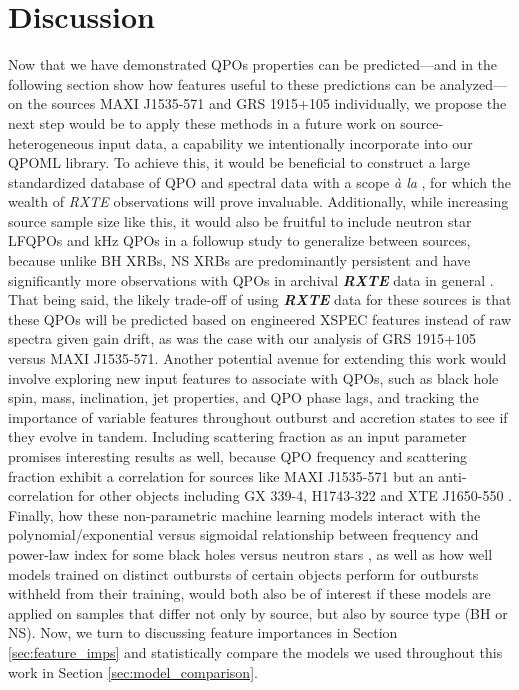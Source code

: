 \documentclass[fleqn,usenatbib,twocolumn]{mnras}%
\begin{document}
\section{Discussion}\label{sec:discussion}

Now that we have demonstrated QPOs properties can be predicted—and in the following section show how features useful to these predictions can be analyzed—on the sources MAXI J1535-571 and GRS 1915+105 individually, we propose the next step would be to apply these methods in a future work on source-heterogeneous input data, a capability we intentionally incorporate into our QPOML library. To achieve this, it would be beneficial to construct a large standardized database of QPO and spectral data with a scope \textit{à la} \cite{blackcat}, for which the wealth of \textit{RXTE} observations will prove invaluable. Additionally, while increasing source sample size like this, it would also be fruitful to include neutron star LFQPOs and kHz QPOs in a followup study to generalize between sources, because unlike BH XRBs, NS XRBs are predominantly persistent and have significantly more observations with QPOs in archival \textbf{\textit{RXTE}} data in general \citep{mendez4U-1608,Migliari2003,belloniMendez2005,cenX-3QPOs}. That being said, the likely trade-off of using \textbf{\textit{RXTE}} data for these sources is that these QPOs will be predicted based on engineered XSPEC features instead of raw spectra given gain drift, as was the case with our analysis of GRS 1915+105 versus MAXI J1535-571. Another potential avenue for extending this work would involve exploring new input features to associate with QPOs, such as black hole spin, mass, inclination, jet properties, and QPO phase lags, and tracking the importance of variable features throughout outburst and accretion states to see if they evolve in tandem. Including scattering fraction as an input parameter promises interesting results as well, because QPO frequency and scattering fraction exhibit a correlation for sources like MAXI J1535-571 but an anti-correlation for other objects including GX 339-4, H1743-322 and XTE J1650-550 \citep{gargEnergyDependence}. Finally, how these non-parametric machine learning models interact with the polynomial/exponential versus sigmoidal relationship between frequency and power-law index for some black holes versus neutron stars \citep{titarchukSigmoidExp}, as well as how well models trained on distinct outbursts of certain objects perform for outbursts withheld from their training, would both also be of interest if these models are applied on samples that differ not only by source, but also by source type (BH or NS). Now, we turn to discussing feature importances in Section \ref{sec:feature_imps} and statistically compare the models we used throughout this work in Section \ref{sec:model_comparison}. 
\end{document}
